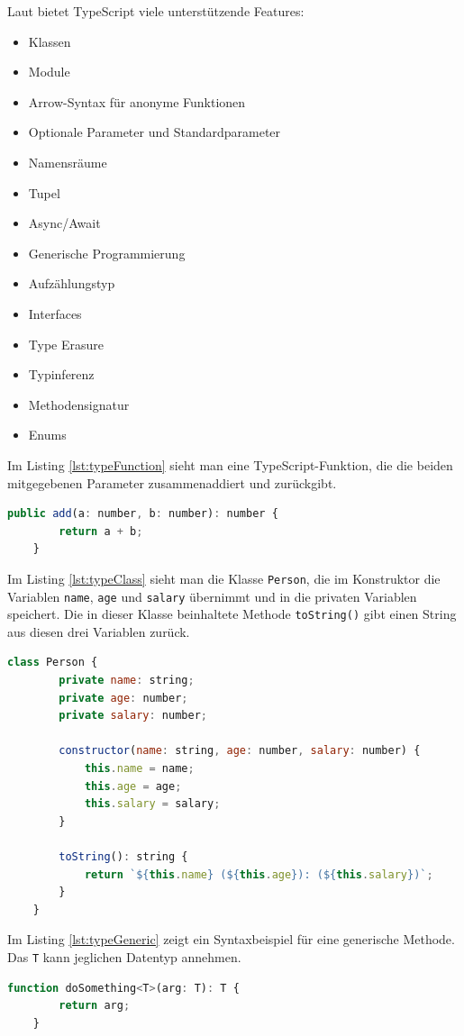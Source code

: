 Laut \autocite{wikiTypeScript} bietet TypeScript viele unterstützende Features:
\begin{itemize}
	\item Klassen
	\item Module
	\item Arrow-Syntax für anonyme Funktionen
	\item Optionale Parameter und Standardparameter
	\item Namensräume
	\item Tupel
	\item Async/Await
	\item Generische Programmierung
	\item Aufzählungstyp
	\item Interfaces
	\item Type Erasure
	\item Typinferenz
	\item Methodensignatur
	\item Enums
\end{itemize}
Im Listing \ref{lst:typeFunction} sieht man eine TypeScript-Funktion, die die beiden mitgegebenen Parameter zusammenaddiert und zurückgibt.
\begin{lstlisting}[caption={TypeScript-Beispiel Function}, language=JavaScript, label={lst:typeFunction}]
	public add(a: number, b: number): number {
		return a + b;
	}
\end{lstlisting}
Im Listing \ref{lst:typeClass} sieht man die Klasse \texttt{Person}, die im Konstruktor die Variablen \texttt{name}, \texttt{age} und \texttt{salary} übernimmt und in die privaten Variablen speichert. Die in dieser Klasse beinhaltete Methode \texttt{toString()} gibt einen String aus diesen drei Variablen zurück.
\begin{lstlisting}[caption={TypeScript-Beispiel Klasse},captionpos=b, language=JavaScript, label={lst:typeClass}]
	class Person {
		private name: string;
		private age: number;
		private salary: number;
		
		constructor(name: string, age: number, salary: number) {
			this.name = name;
			this.age = age;
			this.salary = salary;
		}
		
		toString(): string {
			return `${this.name} (${this.age}): (${this.salary})`;
		}
	}
\end{lstlisting}
Im Listing \ref{lst:typeGeneric} zeigt ein Syntaxbeispiel für eine generische Methode. Das \texttt{T} kann jeglichen Datentyp annehmen.
\begin{lstlisting}[caption={TypeScript-Beispiel Generische Programmierung}, language=JavaScript, label={lst:typeGeneric}]
	function doSomething<T>(arg: T): T {
		return arg;
	}
\end{lstlisting}

